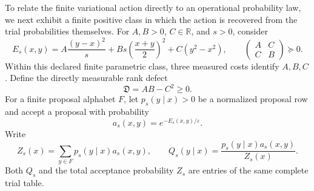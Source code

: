 \documentclass[11pt]{article}
\theoremstyle{definition}
\theoremstyle{remark}
\newcommand{\R}{\mathbb R}
\begin{document}
To relate the finite variational action directly to an operational probability
law, we next exhibit a finite positive class in which the action is recovered
from the trial probabilities themselves.  For $A,B>0$, $C\in\R$, and $s>0$, consider
\begin{equation}
 E_s(x,y)=A\frac{(y-x)^2}{s}
 +Bs\left(\frac{x+y}{2}\right)^2+C(y^2-x^2),
 \qquad
 \begin{pmatrix}A&C\\ C&B\end{pmatrix}\succeq0.
 \label{eq:main-measured-quadratic-cost}
\end{equation}
Within this declared finite parametric class, three measured costs identify
$A,B,C$.  Define the directly measurable rank defect
\begin{equation}
 \boxed{\mathfrak D=AB-C^2\ge0.}
 \label{eq:main-rank-defect}
\end{equation}
For a finite proposal alphabet $F$, let $p_s(y\mid x)>0$ be a normalized
proposal row and accept a proposal with probability
\begin{equation}
 a_s(x,y)=e^{-E_s(x,y)/\varepsilon}.
 \label{eq:main-operational-acceptance}
\end{equation}
Write
\begin{equation}
 Z_s(x)=\sum_{y\in F}p_s(y\mid x)a_s(x,y),\qquad
 Q_s(y\mid x)=\frac{p_s(y\mid x)a_s(x,y)}{Z_s(x)}.
 \label{eq:main-accepted-row-normalizer}
\end{equation}
Both $Q_s$ and the total acceptance probability $Z_s$ are entries of the same
complete trial table.
\end{document}
